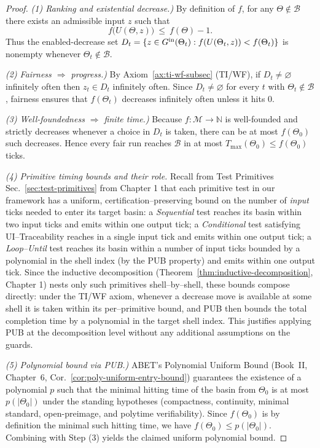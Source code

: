 \documentclass[12pt]{article}
\theoremstyle{definition}
\theoremstyle{plain}
\begin{document}
\begin{proof}
\emph{(1) Ranking and existential decrease.)} By definition of $f$, for any $\Theta\notin\mathcal B$ there exists an admissible input $z$ such that
\[
f\bigl(U(\Theta,z)\bigr)\ \le\ f(\Theta)-1.
\]
Thus the enabled-decrease set $D_t=\{z\in G^{\rm in}(\Theta_t): f(U(\Theta_t,z))<f(\Theta_t)\}$ is nonempty whenever $\Theta_t\notin\mathcal B$.

\emph{(2) Fairness $\Rightarrow$ progress.)} By Axiom~\ref{ax:ti-wf-subsec} (TI/WF), if $D_t\neq\varnothing$ infinitely often then $z_t\in D_t$ infinitely often. Since $D_t\neq\varnothing$ for every $t$ with $\Theta_t\notin\mathcal B$, fairness ensures that $f(\Theta_t)$ decreases infinitely often unless it hits $0$.

\emph{(3) Well-foundedness $\Rightarrow$ finite time.)} Because $f:\mathcal M\to\mathbb N$ is well-founded and strictly decreases whenever a choice in $D_t$ is taken, there can be at most $f(\Theta_0)$ such decreases. Hence every fair run reaches $\mathcal B$ in at most $T_{\max}(\Theta_0)\le f(\Theta_0)$ ticks.

\emph{(4) Primitive timing bounds and their role.}
Recall from Test Primitives Sec.~\ref{sec:test-primitives} from Chapter 1 that each primitive test in our framework has a uniform, certification–preserving bound on the number of \emph{input} ticks needed to enter its target basin: a \emph{Sequential} test reaches its basin within two input ticks and emits within one output tick; a \emph{Conditional} test satisfying UI–Traceability reaches in a single input tick and emits within one output tick; a \emph{Loop–Until} test reaches its basin within a number of input ticks bounded by a polynomial in the shell index (by the PUB property) and emits within one output tick. Since the inductive decomposition (Theorem~\ref{thm:inductive-decomposition}, Chapter 1) nests only such primitives shell–by–shell, these bounds compose directly: under the TI/WF axiom, whenever a decrease move is available at some shell it is taken within its per–primitive bound, and PUB then bounds the total completion time by a polynomial in the target shell index. This justifies applying PUB at the decomposition level without any additional assumptions on the guards.


\emph{(5) Polynomial bound via PUB.)} ABET’s Polynomial Uniform Bound (Book~II, Chapter~6, Cor.~\ref{cor:poly-uniform-entry-bound}) guarantees the existence of a polynomial $p$ such that the minimal hitting time of the basin from $\Theta_0$ is at most $p(|\Theta_0|)$ under the standing hypotheses (compactness, continuity, minimal standard, open-preimage, and polytime verifiability). Since $f(\Theta_0)$ is by definition the minimal such hitting time, we have $f(\Theta_0)\le p(|\Theta_0|)$. Combining with Step (3) yields the claimed uniform polynomial bound.
\end{proof}
\end{document}
